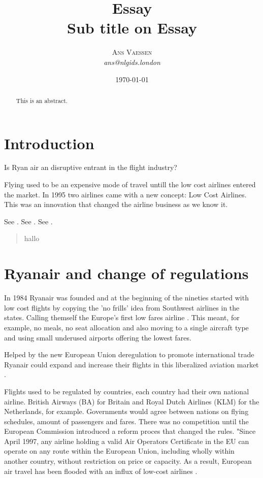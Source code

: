 \documentclass[a4paper, 11pt]{article}
\title{\textbf{Essay}\\Sub title on Essay}
\author{\textsc{Ans Vaessen}
\\{\textit{ans@nlgids.london}}}
\date{\today}
\begin{document}
\maketitle

\begin{abstract}
This is an abstract.
\end{abstract}

\vspace{30pt} %

\section*{Introduction}
Is Ryan air an disruptive entrant in the flight industry? 


Flying used to be an expensive mode of travel untill the low cost airlines entered the market. In 1995 two airlines came with a new concept: Low Cost Airlines. This was an innovation that changed the airline business as we know it.




See \cite{Christensen97}.
See \citep{Christensen97}.
See \citep[p. 145]{Christensen97}.


\begin{quote}
hallo
\end{quote}

\section{Ryanair and change of regulations}

In 1984 Ryanair was founded and at the beginning of the nineties started with low cost flights by copying the 'no frills' idea from Southwest airlines in the states. Calling themself the Europe’s first low fares airline \cite{Ryanair}. This meant, for example, no meals, no seat allocation and also moving to a single aircraft type and using small underused airports \citep{Diaconu} offering the lowest fares. 

Helped by the new European Union deregulation to promote international trade Ryanair could expand and increase their flights in this liberalized aviation market \citep{Dianconu}.

Flights used to be regulated by countries, each country had their own national airline. British Airways (BA) for Britain and Royal Dutch Airlines (KLM) for the Netherlands, for example. Governments would agree between nations on flying schedules, amount of passengers and fares. There was no competition until the European Commission introduced a reform proces that changed the rules. "Since April 1997, any airline holding a valid Air Operators Certificate in the EU can operate on any route within the European Union, including wholly within another country, without restriction on price or capacity. As a result, European air travel has been flooded with an influx of low-cost airlines \citep{Eurocontrol}. 
\end{document}
